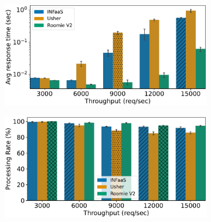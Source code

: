 \begin{figure}[h!]
	\centering
	\begin{subfigure}[b]{0.45\textwidth}
		\centering
		\includegraphics[width=\textwidth]{chapters/roomie/images/NvidiaA100/synthetic-all-models/response_time.pdf}
		\label{fig:NvidiaA100/synthetic-all-models/response-time}
	\end{subfigure}
	\hfill
	\begin{subfigure}[b]{0.45\textwidth}
		\centering
		\includegraphics[width=\textwidth]{chapters/roomie/images/NvidiaA100/synthetic-all-models/normalized.pdf}
	\end{subfigure}
	
	\vspace{0.5cm} %
	

\end{figure}
